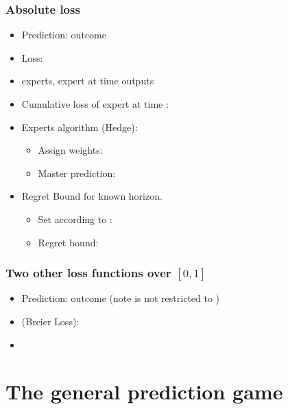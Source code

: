 \documentclass{beamer}
\begin{document}
\begin{frame}
\frametitle{Absolute loss}
\begin{itemize}
\item Prediction:  outcome 
\item Loss: 
\item {} experts, expert  at time  outputs 
\item Cumulative loss of expert  at time : 
\item Experts algorithm (Hedge):
  \begin{itemize}
    \item Assign weights: 
    \item Master prediction:
  \end{itemize}
\item Regret Bound for known horizon.
  \begin{itemize}
  \item Set \R{$\eta$} according to :
  \item Regret bound:
  \end{itemize}
\end{itemize}
\end{frame}

\begin{frame}
\frametitle{Two other loss functions over $[0,1]$}
\begin{itemize}
\item Prediction:  outcome  (note
   is not restricted to )
\item {} (Breier Loss): 
\item {} 
\end{itemize}
\end{frame}

\section{The general prediction game}
\end{document}
